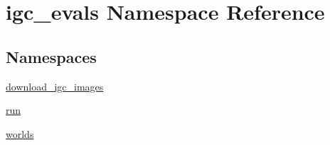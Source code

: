 \hypertarget{namespaceigc__evals}{}\section{igc\+\_\+evals Namespace Reference}
\label{namespaceigc__evals}
\subsection*{Namespaces}
\begin{DoxyCompactItemize}
\item 
 \hyperlink{namespaceigc__evals_1_1download__igc__images}{download\+\_\+igc\+\_\+images}
\item 
 \hyperlink{namespaceigc__evals_1_1run}{run}
\item 
 \hyperlink{namespaceigc__evals_1_1worlds}{worlds}
\end{DoxyCompactItemize}
